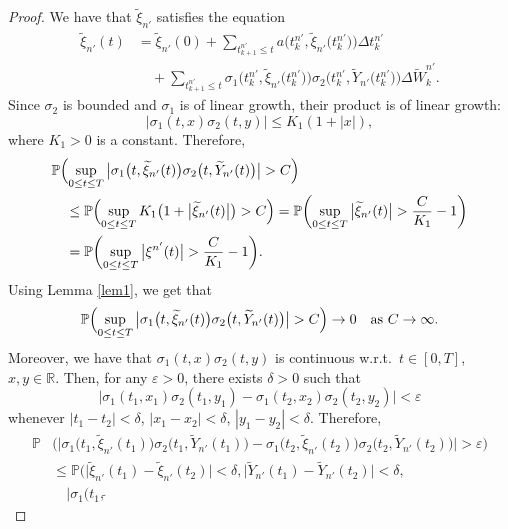 \documentclass[numbers,compress,v1.0.1]{vmsta}
\theoremstyle{remark}
\newcommand{\R}{\mathbb R}
\renewcommand{\P}{\mathbb P}
\newcommand*{\abs}[1]{\left\lvert#1\right\rvert}
\begin{document}
\begin{proof}
We have that $\widetilde{\xi}_{n'}$ satisfies the equation
%
\begin{align*}
\widetilde\xi_{n'}(t) &= \widetilde\xi_{n'}(0) + \sum
_{t_{k+1}^{n'}\leq
t} a \bigl(t_k^{n'},
\widetilde\xi_{n'} \bigl(t_k^{n'} \bigr) \bigr)
\Delta t_k^{n'}
\\
&\quad+\sum_{t_{k+1}^{n'}\leq t}\sigma_1
\bigl(t_k^{n'},\widetilde\xi_{n'}
\bigl(t_k^{n'} \bigr) \bigr) \sigma_2
\bigl(t_k^{n'},\widetilde{Y}_{n'}
\bigl(t_k^{n'} \bigr) \bigr) \Delta\widetilde{W}_k^{n'}.
\end{align*}
%
Since $\sigma_2$ is bounded and $\sigma_1$ is of linear growth, their
product is of linear growth:
%
\[
\big|\sigma_1(t,x)\sigma_2(t,y)\big| \leq K_1(1+
\abs{ x }),
\]
%
where $K_1>0 $ is a constant. Therefore,
%
\begin{align*}
&\P \Bigl(\sup_{0 \leq t\leq T}\big|\sigma_1 \bigl(t,
\widetilde{\xi }_{n'}(t) \bigr) \sigma_2 \bigl(t,
\widetilde{Y}_{n'}(t) \bigr)\big|> C \Bigr)
\\
&\quad\leq\P \Bigl(\sup_{0 \leq t\leq T} K_1 \bigl(1+\big|
\widetilde\xi _{n'}(t) \big| \bigr)>C \Bigr) =\P \biggl(\sup
_{0 \leq t\leq T} \big| \widetilde\xi_{n'}(t) \big|>
\frac
{C}{K_1}-1 \biggr)
\\
&\quad=\P \biggl(\sup_{0 \leq t\leq T} \big| \xi^{n'}(t) \big|>
\frac
{C}{K_1}-1 \biggr).
\end{align*}
%
Using Lemma \ref{lem1}, we get that
%
\[
\P \Bigl(\sup_{0 \leq
t\leq T}\big| \sigma_1 \bigl(t,
\widetilde\xi_{n'}(t) \bigr) \sigma_2 \bigl(t,\widetilde
Y_{n'}(t) \bigr)\big| >C \Bigr)\rightarrow0 \quad\text{as }C\rightarrow
\infty.\vadjust{\eject}
\]
%
Moreover, we have that
$\sigma_1(t,x)\sigma_2(t,y)$ is continuous w.r.t.\ $t \in[0,T]$, $x,y
\in\R$. Then, for any $\varepsilon>0$, there exists $\delta>0$ such that
%
\[
\big|\sigma_1(t_1,x_1)\sigma_2(t_1,y_1)-
\sigma_1(t_2,x_2)\sigma _2(t_2,y_2)\big|
< \varepsilon
\]
%
whenever
$\abs{t_1-t_2} < \delta$, $\abs{x_1-x_2} < \delta$, $\abs{y_1-y_2} <
\delta$.
Therefore,
%
\begin{align*}
\P& \bigl(\big| \sigma_1 \bigl(t_1,\widetilde
\xi_{n'}(t_1) \bigr) \sigma_2
\bigl(t_1,\widetilde{Y}_{n'}(t_1) \bigr)-
\sigma_1 \bigl(t_2,\widetilde\xi_{n'}(t_2)
\bigr) \sigma_2 \bigl(t_2,\widetilde{Y}_{n'}(t_2)
\bigr)\big| > \varepsilon \bigr)
\\
&\leq\P \bigl(\big| \widetilde\xi_{n'}(t_1)-\widetilde
\xi_{n'}(t_2)\big| < \delta, \big|\widetilde{Y}_{n'}(t_1)-
\widetilde{Y}_{n'}(t_2)\big| < \delta ,
\\
&\quad \big|\sigma_1 \bigl(t_1,\widetilde{
}
\end{align*}
\end{proof}
\end{document}
